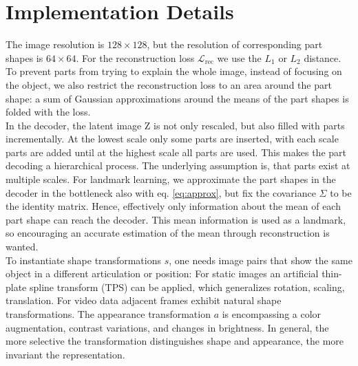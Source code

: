 	\section{Implementation Details}\label{implementationdetails}
		The image resolution is $128 \times 128$, but the resolution of corresponding part shapes is $ 64 \times 64$.
		For the reconstruction  loss $\mathcal{L}_\text{rec}$ we use the $L_1$ or $L_2$ distance.
		To prevent parts from trying to explain the whole image, instead of focusing on the object, we also restrict the reconstruction loss to an area around the part shape: a sum of Gaussian approximations around the means of the part shapes is folded with the loss.\\
		In the decoder, the latent image Z is not only rescaled, but also filled with parts incrementally.
		At the lowest scale only some parts are inserted, with each scale parts are added until at the highest scale all parts are used. This makes the part decoding a hierarchical process. The underlying assumption is, that parts exist at multiple scales.
		For landmark learning, we approximate the part shapes in the decoder in the bottleneck also with eq. \ref{eq:approx}, but fix the covariance $\Sigma$ to be the identity matrix.
		Hence, effectively only information about the mean of each part shape can reach the decoder. This mean information is used as a landmark, so encouraging an accurate estimation of the mean through reconstruction is wanted.\\
		To instantiate shape transformations $s$, one needs image pairs that show the same object in a different articulation or position: For static images an artificial thin-plate spline transform (TPS) can be applied, which generalizes rotation, scaling, translation.
		For video data adjacent frames exhibit natural shape transformations.
		The appearance transformation $a$ is encompassing a color augmentation, contrast variations, and changes in brightness.
		In general, the more selective the transformation distinguishes shape and appearance, the more invariant the representation.
